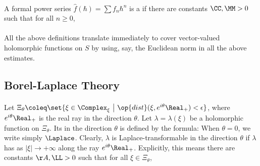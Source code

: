 \documentclass[11pt]{article}
\begin{document}
\begin{appendices}
\paragraph{}
A formal power series $\hat{f} (\hbar) = \sum f_n \hbar^n$ is a  if there are constants $\CC, \MM > 0$ such that for all $n \geq 0$,

\paragraph{}
All the above definitions translate immediately to cover vector-valued holomorphic functions on $S$ by using, say, the Euclidean norm in all the above estimates.




\subsection{Borel-Laplace Theory}
\label{211215123550}

\paragraph{}
\label{211215140949}
Let $\Xi_\theta \coleq \set{ \xi \in \Complex_\xi ~\big|~ \op{dist} (\xi, e^{i\theta}\Real_+) < \epsilon}$, where $e^{i \theta} \Real_+$ is the real ray in the direction $\theta$.
Let $\lambda = \lambda (\xi)$ be a holomorphic function on $\Xi_\theta$.
Its  in the direction $\theta$ is defined by the formula:
When $\theta = 0$, we write simply $\Laplace$.
Clearly, $\lambda$ is Laplace-transformable in the direction $\theta$ if $\lambda$ has  as $|\xi| \to + \infty$ along the ray $e^{i\theta} \Real_+$.
Explicitly, this means there are constants $\AA, \LL > 0$ such that for all $\xi \in \Xi_\theta$,


\end{appendices}
\end{document}
